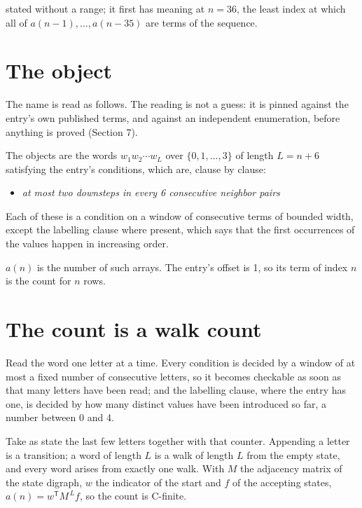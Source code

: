 \documentclass[11pt]{article}
\theoremstyle{definition}
\begin{document}
stated without a range; it first has meaning at $n = 36$, the least index at which all of $a(n-1),\dots,a(n-35)$ are terms of the sequence.

\section{The object}

The name is read as follows. The reading is not a guess: it is pinned against the entry's own published terms, and against an independent enumeration, before anything is proved (Section 7).

The objects are the words $w_1 w_2 \cdots w_L$ over $\{0,1,\dots,3\}$ of length $L = n + 6$ satisfying the entry's conditions, which are, clause by clause:

\begin{itemize}

\item {\itshape at most two downsteps in every 6 consecutive neighbor pairs}

\end{itemize}

Each of these is a condition on a window of consecutive terms of bounded width, except the labelling clause where present, which says that the first occurrences of the values happen in increasing order.

$a(n)$ is the number of such arrays. The entry's offset is 1, so its term of index $n$ is the count for $n$ rows.

\section{The count is a walk count}

Read the word one letter at a time. Every condition is decided by a window of at most a fixed number of consecutive letters, so it becomes checkable as soon as that many letters have been read; and the labelling clause, where the entry has one, is decided by how many distinct values have been introduced so far, a number between $0$ and 4.

Take as state the last few letters together with that counter. Appending a letter is a transition; a word of length $L$ is a walk of length $L$ from the empty state, and every word arises from exactly one walk. With $M$ the adjacency matrix of the state digraph, $w$ the indicator of the start and $f$ of the accepting states, $a(n) = w^{\mathsf T}M^{\,L}f$, so the count is C-finite.
\end{document}
